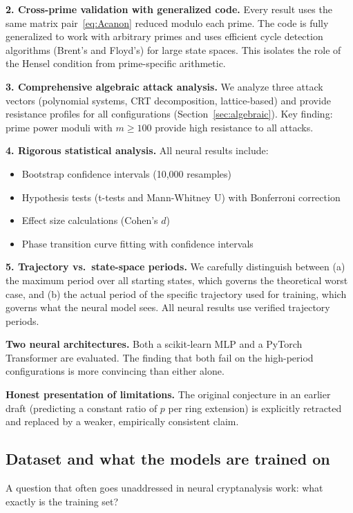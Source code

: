 \documentclass[11pt]{article}
\theoremstyle{plain}
\theoremstyle{definition}
\begin{document}
\textbf{2. Cross-prime validation with generalized code.} Every result uses the same matrix pair~\eqref{eq:Acanon} reduced modulo each prime. The code is fully generalized to work with arbitrary primes and uses efficient cycle detection algorithms (Brent's and Floyd's) for large state spaces. This isolates the role of the Hensel condition from prime-specific arithmetic.

\textbf{3. Comprehensive algebraic attack analysis.} We analyze three attack vectors (polynomial systems, CRT decomposition, lattice-based) and provide resistance profiles for all configurations (Section~\ref{sec:algebraic}). Key finding: prime power moduli with $m \geq 100$ provide high resistance to all attacks.

\textbf{4. Rigorous statistical analysis.} All neural results include:
\begin{itemize}[leftmargin=2em]
  \item Bootstrap confidence intervals (10,000 resamples)
  \item Hypothesis tests (t-tests and Mann-Whitney U) with Bonferroni correction
  \item Effect size calculations (Cohen's $d$)
  \item Phase transition curve fitting with confidence intervals
\end{itemize}

\textbf{5. Trajectory vs.\ state-space periods.} We carefully distinguish between (a) the maximum period over all starting states, which governs the theoretical worst case, and (b) the actual period of the specific trajectory used for training, which governs what the neural model sees. All neural results use verified trajectory periods.

\textbf{Two neural architectures.} Both a scikit-learn MLP and a PyTorch Transformer are evaluated. The finding that both fail on the high-period configurations is more convincing than either alone.

\textbf{Honest presentation of limitations.} The original conjecture in an earlier draft (predicting a constant ratio of $p$ per ring extension) is explicitly retracted and replaced by a weaker, empirically consistent claim.

\subsection{Dataset and what the models are trained on}

A question that often goes unaddressed in neural cryptanalysis work: what exactly is the training set?
\end{document}
